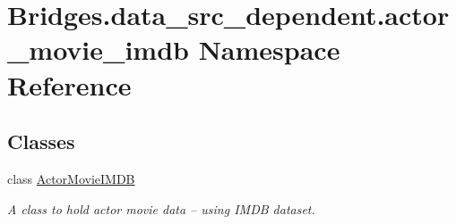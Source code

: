 \hypertarget{namespace_bridges_1_1data__src__dependent_1_1actor__movie__imdb}{}\section{Bridges.\+data\+\_\+src\+\_\+dependent.\+actor\+\_\+movie\+\_\+imdb Namespace Reference}
\label{namespace_bridges_1_1data__src__dependent_1_1actor__movie__imdb}
\subsection*{Classes}
\begin{DoxyCompactItemize}
\item 
class \hyperlink{class_bridges_1_1data__src__dependent_1_1actor__movie__imdb_1_1_actor_movie_i_m_d_b}{Actor\+Movie\+I\+M\+D\+B}
\begin{DoxyCompactList}\small\item\em A class to hold actor movie data -- using I\+M\+D\+B dataset. \end{DoxyCompactList}\end{DoxyCompactItemize}
